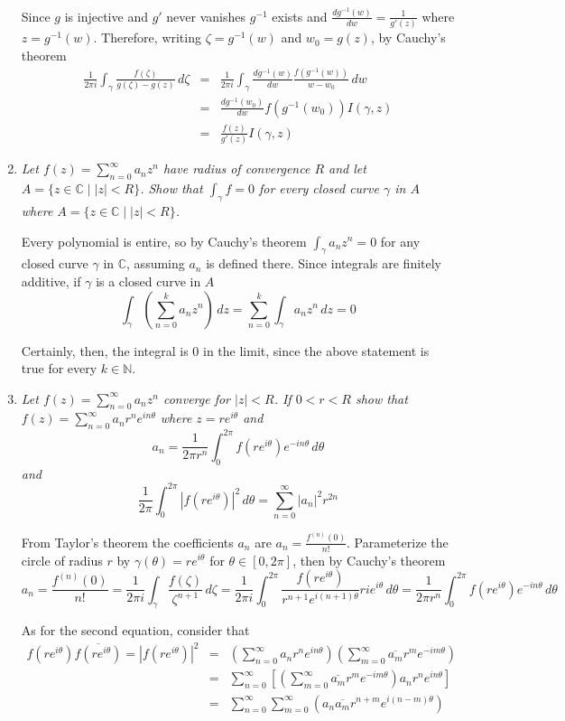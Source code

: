\documentclass[letterpaper, 11pt]{article}
\newcommand{\C}{\mathbb{C}}
\newcommand{\N}{\mathbb{N}}
\begin{document}
\begin{enumerate}
Since $g$ is injective and $g'$ never vanishes $g^{-1}$ exists and $\frac{dg^{-1}(w)}{dw} = \frac{1}{g'(z)}$ where $z = g^{-1}(w)$.  Therefore, writing $\zeta = g^{-1}(w)$ and $w_0 = g(z)$, by Cauchy's theorem
\begin{eqnarray*}
\frac{1}{2\pi i} \int_{\gamma} \frac{f(\zeta)}{g(\zeta) - g(z)}\,d\zeta &=& \frac{1}{2\pi i} \int_{\gamma} \frac{dg^{-1}(w)}{dw} \frac{f\left(g^{-1}(w)\right)}{w - w_0} \,dw \\
&=&  \frac{dg^{-1}(w_0)}{dw} f\left(g^{-1}(w_0)\right) I\left(\gamma, z\right) \\
&=& \frac{f(z)}{g'(z)}I\left(\gamma, z\right)
\end{eqnarray*}

\item \emph{Let $f(z) = \sum_{n=0}^\infty a_nz^n$ have radius of convergence $R$ and let $A = \{z \in \C \mid |z| < R\}$.  Show that $\int_{\gamma} f = 0$ for every closed curve $\gamma$ in $A$ where $A = \{z \in \C \mid |z| < R\}$.}

Every polynomial is entire, so by Cauchy's theorem $\int_{\gamma} a_nz^n = 0$ for any closed curve $\gamma$ in $\C$, assuming $a_n$ is defined there.  Since integrals are finitely additive, if $\gamma$ is a closed curve in $A$
\[
\int_{\gamma} \left(\sum_{n=0}^k a_nz^n\right) \,dz = \sum_{n=0}^k \int_{\gamma} a_nz^n \,dz = 0
\]

Certainly, then, the integral is $0$ in the limit, since the above statement is true for every $k \in \N$.
\item \emph{Let $f(z) = \sum_{n=0}^\infty a_nz^n$ converge for $|z| < R$.  If $0 < r < R$ show that $f(z) = \sum_{n=0}^\infty a_nr^ne^{in\theta}$ where $z = re^{i\theta}$ and $$a_n = \frac{1}{2 \pi r^n} \int_0^{2 \pi} f\left(re^{i\theta}\right) e^{-in\theta} \,d\theta$$ and $$\frac{1}{2\pi} \int_0^{2\pi} \left|f\left(re^{i\theta}\right)\right|^2\,d\theta = \sum_{n=0}^\infty |a_n|^2r^{2n}$$}

From Taylor's theorem the coefficients $a_n$ are $a_n = \frac{f^{(n)}(0)}{n!}$.  Parameterize the circle of radius $r$ by $\gamma(\theta) = re^{i\theta}$ for $\theta \in [0,2\pi]$, then by Cauchy's theorem
\[
a_n = \frac{f^{(n)}(0)}{n!} = \frac{1}{2\pi i}\int_{\gamma} \frac{f(\zeta)}{\zeta^{n+1}}\,d\zeta = \frac{1}{2\pi i}\int_0^{2\pi} \frac{f(re^{i\theta})}{r^{n+1}e^{i(n+1)\theta}} rie^{i\theta}\,d\theta = \frac{1}{2\pi r^n} \int_0^{2\pi} f(re^{i\theta}) e^{-in\theta} \,d\theta
\]

As for the second equation, consider that
\begin{eqnarray*}
f\left(re^{i\theta}\right)\overline{f\left(re^{i\theta}\right)} = \left|f\left(re^{i\theta}\right)\right|^2 &=& \left(\sum_{n=0}^\infty a_n r^n e^{in\theta}\right)\left(\sum_{m=0}^\infty \overline{a_m} r^m e^{-im\theta}\right) \\
&=& \sum_{n=0}^\infty\left[\left(\sum_{m=0}^\infty \overline{a_m} r^m e^{-im\theta}\right)a_n r^n e^{in\theta}\right] \\
&=& \sum_{n=0}^\infty\sum_{m=0}^\infty \left(a_n\overline{a_m} r^{n+m} e^{i(n-m)\theta}\right)
\end{eqnarray*}


\end{enumerate}
\end{document}
